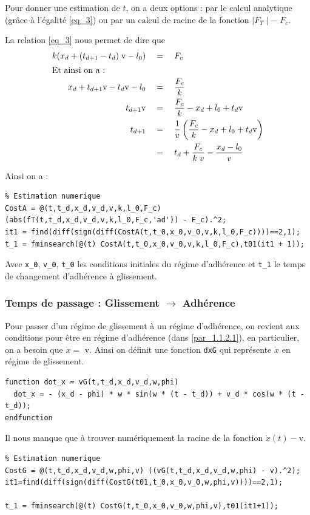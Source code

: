 \documentclass{article}
\newcommand{\ts}{\scriptscriptstyle}
\begin{document}
Pour donner une estimation de $t$, on a deux options : par le calcul analytique (grâce à l'égalité \eqref{eq_3}) ou par un calcul de racine de la fonction $\mid F_{\ts T}\mid -\; F_c$.

La relation \eqref{eq_3} nous permet de dire que 
\begin{align}
k(x_d+(t_{d+1}-t_d)\;\text{v}-l_0) \quad &= \quad F_c \nonumber\\
\intertext{Et ainsi on a :}
x_d+t_{d+1}\text{v}-t_d\text{v}-l_0 \quad &= \quad \dfrac{F_c}{k}\nonumber\\
t_{d+1}\text{v}\quad &= \quad \dfrac{F_c}{k}-x_d+l_0+t_d\text{v}\nonumber\\
t_{d+1}\quad &=\quad \dfrac{1}{v}\left(\dfrac{F_c}{k}-x_d+l_0+t_d\text{v}\right)\nonumber\\
&=\quad t_d + \dfrac{F_c}{k\;v} - \dfrac{x_d - l_0}{v}
\end{align}

Ainsi on a :
\begin{lstlisting}
% Estimation numerique
CostA = @(t,t_d,x_d,v_d,v,k,l_0,F_c) (abs(fT(t,t_d,x_d,v_d,v,k,l_0,F_c,'ad')) - F_c).^2;
it1 = find(diff(sign(diff(CostA(t,t_0,x_0,v_0,v,k,l_0,F_c))))==2,1);
t_1 = fminsearch(@(t) CostA(t,t_0,x_0,v_0,v,k,l_0,F_c),t01(it1 + 1));
\end{lstlisting}
Avec \verb|x_0|, \verb|v_0|, \verb|t_0| les conditions initiales du régime d'adhérence et \verb|t_1| le temps de changement d'adhérence à glissement.

\subsubsection{Temps de passage : Glissement $\rightarrow$ Adhérence}\label{sssec_2.2.2}
Pour passer d'un régime de glissement à un régime d'adhérence, on revient aux conditions pour être en régime d'adhérence (dans \ref{par_1.1.2.1}), en particulier, on a besoin que $\dot x = $ v.
Ainsi on définit une fonction \verb|dxG| qui représente $\dot x$ en régime de glissement.
\begin{lstlisting}
function dot_x = vG(t,t_d,x_d,v_d,w,phi)
  dot_x = - (x_d - phi) * w * sin(w * (t - t_d)) + v_d * cos(w * (t - t_d));
endfunction
\end{lstlisting}

Il nous manque que à trouver numériquement la racine de la fonction $\dot x(t) -$v.
\begin{lstlisting}
% Estimation numerique
CostG = @(t,t_d,x_d,v_d,w,phi,v) ((vG(t,t_d,x_d,v_d,w,phi) - v).^2);
it1=find(diff(sign(diff(CostG(t01,t_0,x_0,v_0,w,phi,v))))==2,1);

t_1 = fminsearch(@(t) CostG(t,t_0,x_0,v_0,w,phi,v),t01(it1+1));
\end{lstlisting}
\end{document}
